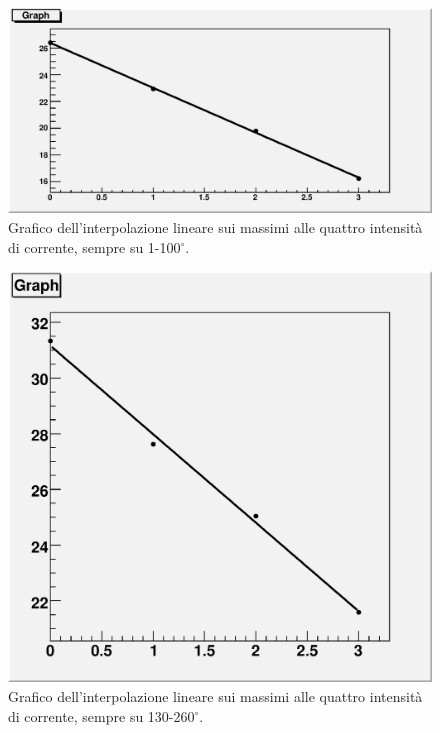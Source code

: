 \documentclass[italian,a4paper]{article}
\begin{document}
\begin{figure}[h]
    \begin{center}
        \includegraphics[height=0.4\textheight, width=.9\textwidth]{grafici/1-100verdet.eps}
    \end{center}
    \caption{Grafico dell'interpolazione lineare sui massimi alle quattro
    intensità di corrente, sempre su 1-100$^\circ$.}
    \label{fig:1100g}
\end{figure}
\begin{figure}[h]
    \begin{center}
        \includegraphics[height=0.4\textheight, width=.9\textwidth]{grafici/130-260verdet.eps}
    \end{center}
    \caption{Grafico dell'interpolazione lineare sui massimi alle quattro
    intensità di corrente, sempre su 130-260$^\circ$.}
    \label{fig:130260g}
\end{figure}
\end{document}
